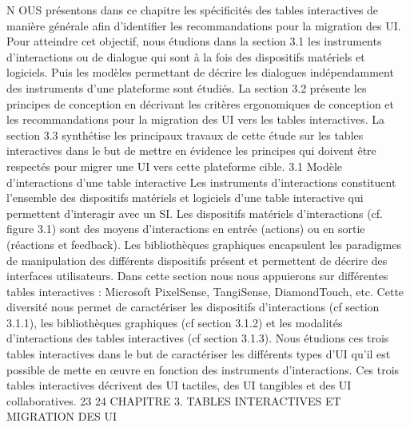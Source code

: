 \documentclass{article}
\begin{document}
N
OUS pr\'{e}sentons dans ce chapitre les sp\'{e}ciﬁcit\'{e}s des tables interactives de mani\`{e}re g\'{e}n\'{e}rale aﬁn
d’identiﬁer les recommandations pour la migration des UI. Pour atteindre cet objectif, nous
\'{e}tudions dans la section 3.1 les instruments d’interactions ou de dialogue qui sont \`{a} la fois des dispositifs mat\'{e}riels et logiciels. Puis les mod\`{e}les permettant de d\'{e}crire les dialogues ind\'{e}pendamment
des instruments d’une plateforme sont \'{e}tudi\'{e}s. La section 3.2 pr\'{e}sente les principes de conception en
d\'{e}crivant les crit\`{e}res ergonomiques de conception et les recommandations pour la migration des UI
vers les tables interactives. La section 3.3 synth\'{e}tise les principaux travaux de cette \'{e}tude sur les tables
interactives dans le but de mettre en \'{e}vidence les principes qui doivent \^{e}tre respect\'{e}s pour migrer une
UI vers cette plateforme cible.
3.1
Mod\`{e}le d’interactions d’une table interactive
Les instruments d’interactions constituent l’ensemble des dispositifs mat\'{e}riels et logiciels d’une
table interactive qui permettent d’interagir avec un SI. Les dispositifs mat\'{e}riels d’interactions (cf.
ﬁgure 3.1) sont des moyens d’interactions en entr\'{e}e (actions) ou en sortie (r\'{e}actions et feedback).
Les biblioth\`{e}ques graphiques encapsulent les paradigmes de manipulation des diff\'{e}rents dispositifs
pr\'{e}sent et permettent de d\'{e}crire des interfaces utilisateurs.
Dans cette section nous nous appuierons sur diff\'{e}rentes tables interactives : Microsoft PixelSense,
TangiSense, DiamondTouch, etc. Cette diversit\'{e} nous permet de caract\'{e}riser les dispositifs d’interactions (cf section 3.1.1), les biblioth\`{e}ques graphiques (cf section 3.1.2) et les modalit\'{e}s d’interactions
des tables interactives (cf section 3.1.3).
Nous \'{e}tudions ces trois tables interactives dans le but de caract\'{e}riser les diff\'{e}rents types d’UI qu’il
est possible de mette en œuvre en fonction des instruments d’interactions. Ces trois tables interactives
d\'{e}crivent des UI tactiles, des UI tangibles et des UI collaboratives.
23
24
CHAPITRE 3. TABLES INTERACTIVES ET MIGRATION DES UI
 
 
 
\end{document}
